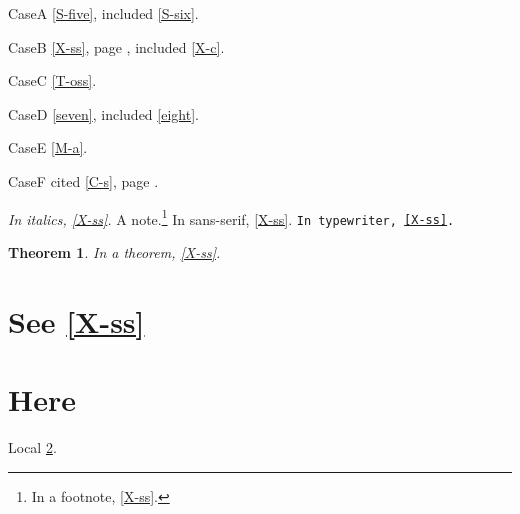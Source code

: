 \documentclass{article}
\newtheorem{theorem}{Theorem}
\begin{document}
CaseA \ref{S-five}, included \ref{S-six}.

CaseB \ref{X-ss}, page \pageref{X-front}, included \ref{X-c}.

CaseC \ref{T-oss}.

CaseD \ref{seven}, included \ref{eight}.

CaseE \ref{M-a}.

CaseF cited \ref{C-s}, page \pageref{C-front}.

\textit{In italics, \ref{X-ss}.}
A note.\footnote{In a footnote, \ref{X-ss}.}
\textsf{In sans-serif, \ref{X-ss}.}
\texttt{In typewriter, \ref{X-ss}.}

\begin{theorem}
In a theorem, \ref{X-ss}.
\end{theorem}

\section{See \ref{X-ss}}

\section{Here}\label{here}
Local \ref{here}.
\end{document}
